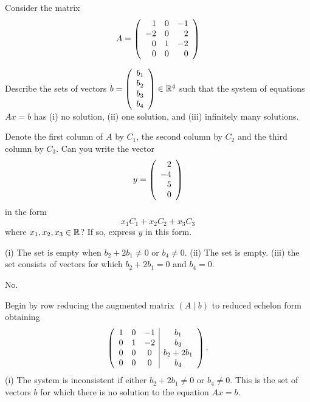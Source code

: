 \documentclass{ximera}
\author{Matthew Carr \& Martin Golubitsky}
\begin{document}
\begin{exercise}\label{mc.exerciseErr5}
Consider the matrix
\[
A=\left(\begin{array}{rrrrrrrrrrrrrrrrrr} 1 & 0 & -1 \\ -2 & 0 & 2 \\ 0 & 1 & -2 \\ 0 & 0 & 0 \end{array}\right)
\]
\begin{enumeratea}%
\item Describe the sets of vectors $b=\left(\begin{array}{rrrrrrrrrrrrrrrrrr} b_1\\b_2\\b_3\\b_4 \end{array}\right)\in\mathbb{R}^4$ such that the system of equations $Ax=b$ has (i) no solution, (ii) one solution, and (iii) infinitely many solutions.
\item Denote the first column of $A$ by $C_1$, the second column by $C_2$ and the third column by $C_3$.
Can you write the vector 
\[ 
y=\left(\begin{array}{rrrrrrrrrrrrrrrrrr} 2\\-4\\5 \\ 0 \end{array}\right)
\]
in the form 
\begin{equation} \label{e:linear_comb}
x_1 C_1 + x_2 C_2 + x_3 C_3
\end{equation}
where $x_1, x_2, x_3 \in\mbox{$\mathbb{R}$}$?  If so, express $y$ in this form.
\end{enumeratea}


\begin{solution}

\ans \begin{enumeratea}%
\item (i) The set is empty when $b_2+2b_1\neq 0$ or $b_4\neq 0$. (ii) The set is empty.  (iii) the set consists of vectors for which $b_2+2b_1 = 0$ and $b_4 = 0$.
\item No.
\end{enumeratea}

\soln

\begin{enumeratea}%
\item Begin by row reducing the augmented matrix $\left(A\mid b\right)$ to reduced echelon form obtaining
\[
\left(\begin{array}{ccc|c} 
1 & 0 & -1 & b_1 \\ 
0 & 1 & -2 & b_3 \\ 
0 & 0 & 0 & b_2+2b_1 \\ 
0 & 0 & 0 & b_4
\end{array}\right)\ldotp
\]
(i) The system is inconsistent if either $b_2+2b_1\neq 0$ or $b_4 \neq 0$. This is the set of vectors $b$ for which there is no solution to the equation $Ax=b$.


\end{enumeratea}
\end{solution}
\end{exercise}
\end{document}
